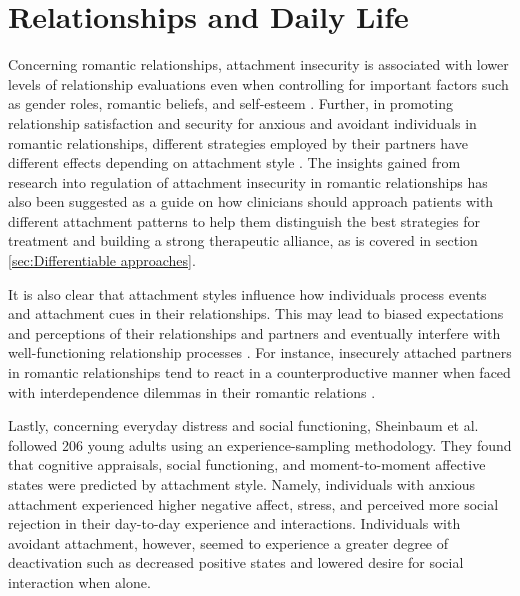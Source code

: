 \documentclass[12pt]{report}
\begin{document}
\section{Relationships and Daily Life}
Concerning romantic relationships, attachment insecurity is associated with lower levels of relationship evaluations even when controlling for important factors such as gender roles, romantic beliefs, and self-esteem .
Further, in promoting relationship satisfaction and security for anxious and avoidant individuals in romantic relationships, different strategies employed by their partners have different effects depending on attachment style \cite{Overall2015}.
The insights gained from research into regulation of attachment insecurity in romantic relationships has also been suggested as a guide on how clinicians should approach patients with different attachment patterns to help them distinguish the best strategies for treatment and building a strong therapeutic alliance, as is covered in section \ref{sec:Differentiable approaches}.

It is also clear that attachment styles influence how individuals process events and attachment cues in their relationships.
This may lead to biased expectations and perceptions of their relationships and partners and eventually interfere with well-functioning relationship processes \cite{Collins2007, Collins2004, Hazan1994, Mikulincer2003, Rodriguez2019}.
For instance, insecurely attached partners in romantic relationships tend to react in a counterproductive manner when faced with interdependence dilemmas in their romantic relations \cite{Simpson2012}.

Lastly, concerning everyday distress and social functioning, Sheinbaum et al. \citeyear{Sheinbaum2015} followed 206 young adults using an experience-sampling methodology.
They found that cognitive appraisals, social functioning, and moment-to-moment affective states were predicted by attachment style.
Namely, individuals with anxious attachment experienced higher negative affect, stress, and perceived more social rejection in their day-to-day experience and interactions.
Individuals with avoidant attachment, however, seemed to experience a greater degree of deactivation such as decreased positive states and lowered desire for social interaction when alone.
\end{document}

